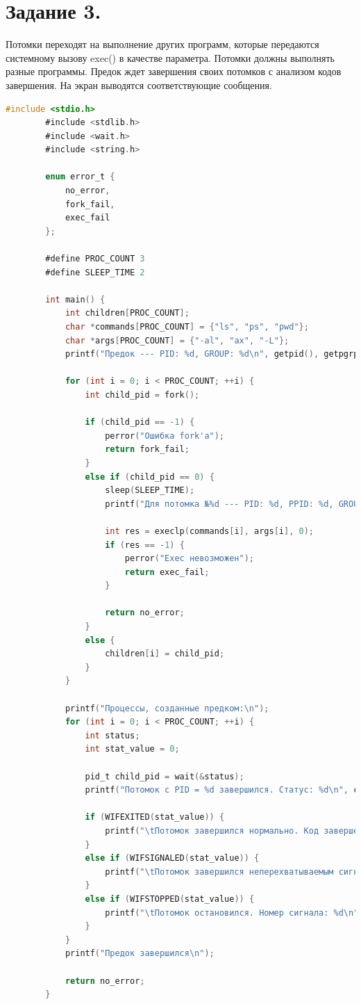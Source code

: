 \documentclass[12pt]{report}
\begin{document}
	\section*{Задание 3.}
	Потомки переходят на выполнение других программ, которые передаются
	системному вызову exec() в качестве параметра.
	Потомки должны выполнять разные программы.
	Предок ждет завершения своих потомков с анализом кодов завершения.
	На экран выводятся соответствующие сообщения.
	
	\begin{lstlisting}[label=code:exec, caption=exec(), language=C]
		#include <stdio.h>
		#include <stdlib.h>
		#include <wait.h>
		#include <string.h>
		
		enum error_t {
			no_error,
			fork_fail,
			exec_fail
		};
		
		#define PROC_COUNT 3
		#define SLEEP_TIME 2
		
		int main() {
			int children[PROC_COUNT];
			char *commands[PROC_COUNT] = {"ls", "ps", "pwd"};
			char *args[PROC_COUNT] = {"-al", "ax", "-L"};
			printf("Предок --- PID: %d, GROUP: %d\n", getpid(), getpgrp());
			
			for (int i = 0; i < PROC_COUNT; ++i) {
				int child_pid = fork();
				
				if (child_pid == -1) {
					perror("Ошибка fork'а");
					return fork_fail;
				}
				else if (child_pid == 0) {
					sleep(SLEEP_TIME);
					printf("Для потомка №%d --- PID: %d, PPID: %d, GROUP: %d\n", i + 1, getpid(), getppid(), getpgrp());
					
					int res = execlp(commands[i], args[i], 0);
					if (res == -1) {
						perror("Exec невозможен");
						return exec_fail;
					}
					
					return no_error;
				}
				else {
					children[i] = child_pid;
				}
			}
			
			printf("Процессы, созданные предком:\n");
			for (int i = 0; i < PROC_COUNT; ++i) {
				int status;
				int stat_value = 0;
				
				pid_t child_pid = wait(&status);
				printf("Потомок с PID = %d завершился. Статус: %d\n", children[i], status);
				
				if (WIFEXITED(stat_value)) {
					printf("\tПотомок завершился нормально. Код завершения: %d\n", WEXITSTATUS(stat_value));
				}
				else if (WIFSIGNALED(stat_value)) {
					printf("\tПотомок завершился неперехватываемым сигналом. Номер сигнала: %d\n", WTERMSIG(stat_value));
				}
				else if (WIFSTOPPED(stat_value)) {
					printf("\tПотомок остановился. Номер сигнала: %d\n", WSTOPSIG(stat_value));
				}
			}
			printf("Предок завершился\n");
			
			return no_error;
		}
	\end{lstlisting}
\end{document}
